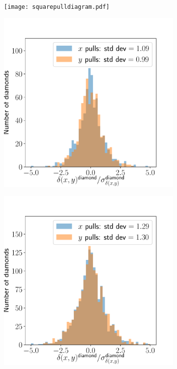 \documentclass{article}
\begin{document}
\begin{figure}[ht]
\begin{subfigure}{0.32\linewidth}
		\caption{}
		\label{fig:squarepull2}
	\end{subfigure}
	\begin{subfigure}{0.32\linewidth}
		\texttt{[image: squarepulldiagram.pdf]}
		\caption{}
		\label{fig:squarepulldiagram}
	\end{subfigure}
	\begin{subfigure}{0.32\linewidth}
		\includegraphics[width=\linewidth]{diamondpull1.pdf}
		\caption{}
		\label{fig:diamondpull1}
	\end{subfigure}
	\begin{subfigure}{0.32\linewidth}
		\includegraphics[width=\linewidth]{diamondpull2.pdf}

\end{subfigure}
\end{figure}
\end{document}
